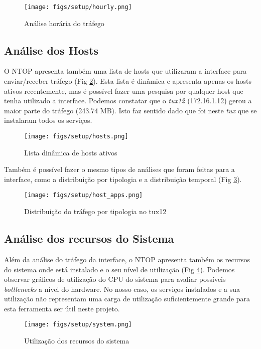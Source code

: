 \begin{figure}
    \centering
    \texttt{[image: figs/setup/hourly.png]}
    \caption{Análise horária do tráfego}
    \label{fig:hourly}
\end{figure}

\subsection{Análise dos Hosts}

O NTOP apresenta também uma lista de hosts que utilizaram a interface para enviar/receber tráfego (Fig \ref{fig:hosts}).
Esta lista é dinâmica e apresenta apenas os hosts ativos recentemente, mas é possível fazer uma pesquisa por qualquer host que tenha utilizado a interface.
Podemos constatar que o \textit{tux12} (172.16.1.12) gerou a maior parte do tráfego (243.74 MB).
Isto faz sentido dado que foi neste \textit{tux} que se instalaram todos os serviços.

\begin{figure}
    \centering
    \texttt{[image: figs/setup/hosts.png]}
    \caption{Lista dinâmica de hosts ativos}
    \label{fig:hosts}
\end{figure}

Também é possível fazer o mesmo tipos de análises que foram feitas para a interface, como a distribuição por tipologia e a distribuição temporal (Fig \ref{fig:hosts_apps}).

\begin{figure}
    \centering
    \texttt{[image: figs/setup/host\_apps.png]}
    \caption{Distribuição do tráfego por tipologia no tux12}
    \label{fig:hosts_apps}
\end{figure}

\subsection{Análise dos recursos do Sistema}

Além da análise do tráfego da interface, o NTOP apresenta também os recursos do sistema onde está instalado e o seu nível de utilização (Fig \ref{fig:system}).
Podemos observar gráficos de utilização do CPU do sistema para avaliar possíveis \textit{bottlenecks} a nível do hardware.
No nosso caso, os serviços instalados e a sua utilização não representam uma carga de utilização suficientemente grande para esta ferramenta ser útil neste projeto.

\begin{figure}
    \centering
    \texttt{[image: figs/setup/system.png]}
    \caption{Utilização dos recursos do sistema}
    \label{fig:system}
\end{figure}

